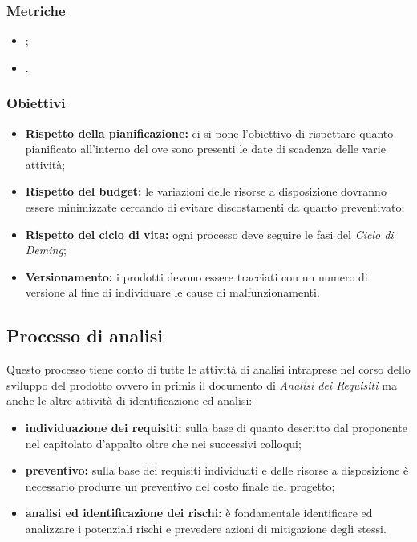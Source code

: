 \subsubsection{Metriche}

\begin{itemize}
    \item {};
    \item {}.
\end{itemize}

\subsubsection{Obiettivi}
\begin{itemize}
    \item \textbf{Rispetto della pianificazione:} ci si pone l'obiettivo di rispettare quanto pianificato all'interno del 
          ove sono presenti le date di scadenza delle varie attività;
    \item \textbf{Rispetto del budget:} le variazioni delle risorse a disposizione dovranno essere minimizzate cercando di evitare discostamenti da quanto preventivato;
    \item \textbf{Rispetto del ciclo di vita:} ogni processo deve seguire le fasi del \textit{Ciclo di Deming};
    \item \textbf{Versionamento:} i prodotti devono essere tracciati con un numero di versione al fine di individuare le cause di malfunzionamenti.
\end{itemize}

\subsection{Processo di analisi}
Questo processo tiene conto di tutte le attività di analisi intraprese nel corso dello sviluppo del prodotto ovvero in primis il documento di \textit{Analisi dei Requisiti}
ma anche le altre attività di identificazione ed analisi:

\begin{itemize}
    \item  \textbf{individuazione dei requisiti:} sulla base di quanto descritto dal proponente nel capitolato d'appalto oltre che nei successivi colloqui;
    \item \textbf{preventivo:} sulla base dei requisiti individuati e delle risorse a disposizione è necessario produrre un preventivo del costo finale del progetto;
    \item \textbf{analisi ed identificazione dei rischi:} è fondamentale identificare ed analizzare i potenziali rischi e prevedere azioni di mitigazione degli stessi.
\end{itemize}

